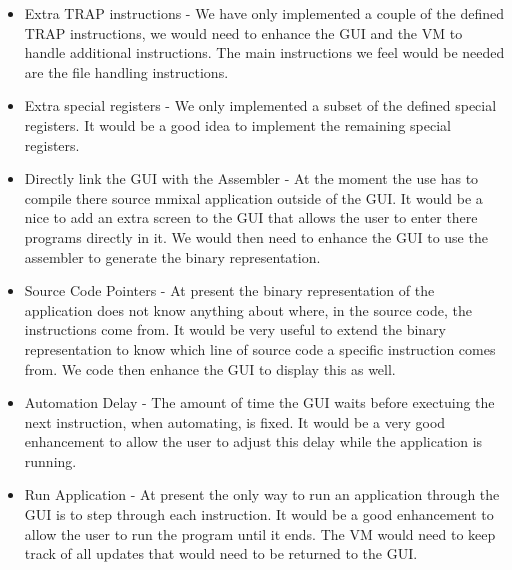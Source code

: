 \documentclass[a4paper,11pt]{report}
\begin{document}
\begin{itemize}
\item Extra TRAP instructions - We have only implemented a couple of the defined TRAP instructions, we would need to enhance the GUI and the VM to handle additional instructions. The main instructions we feel would be needed are the file handling instructions.
\item Extra special registers - We only implemented a subset of the defined special registers. It would be a good idea to implement the remaining special registers.
\item Directly link the GUI with the Assembler - At the moment the use has to compile there source mmixal application outside of the GUI. It would be a nice to add an extra screen to the GUI that allows the user to enter there programs directly in it. We would then need to enhance the GUI to use the assembler to generate the binary representation.
\item Source Code Pointers - At present the binary representation of the application does not know anything about where, in the source code, the instructions come from. It would be very useful to extend the binary representation to know which line of source code a specific instruction comes from. We code then enhance the GUI to display this as well.
\item Automation Delay - The amount of time the GUI waits before exectuing the next instruction, when automating, is fixed. It would be a very good enhancement to allow the user to adjust this delay while the application is running.
\item Run Application - At present the only way to run an application through the GUI is to step through each instruction. It would be a good enhancement to allow the user to run the program until it ends. The VM would need to keep track of all updates that would need to be returned to the GUI.
\end{itemize}
\end{document}
